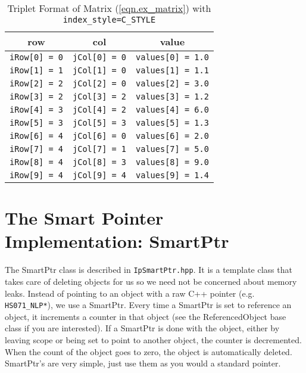 \documentclass[letter,10pt]{article}
\begin{document}
\begin{footnotesize}
\begin{table}[h]
\end{table}
\begin{table}[h]%
\begin{center}
\caption{Triplet Format of Matrix (\ref{eqn.ex_matrix}) 
with {\tt index\_style=C\_STYLE}}
\label{tab.sym_c_triplet}
\begin{tabular}{c c c}
row     		&       col     	&       value 			    \\
\hline
{\tt iRow[0] = 0}       &       {\tt jCol[0] = 0}       & {\tt values[0] = 1.0}     \\
{\tt iRow[1] = 1}       &       {\tt jCol[1] = 0}       & {\tt values[1] = 1.1}     \\
{\tt iRow[2] = 2}       &       {\tt jCol[2] = 0}       & {\tt values[2] = 3.0}     \\
{\tt iRow[3] = 2}       &       {\tt jCol[3] = 2}       & {\tt values[3] = 1.2}     \\
{\tt iRow[4] = 3}       &       {\tt jCol[4] = 2}       & {\tt values[4] = 6.0}     \\
{\tt iRow[5] = 3}       &       {\tt jCol[5] = 3}       & {\tt values[5] = 1.3}     \\
{\tt iRow[6] = 4}       &       {\tt jCol[6] = 0}       & {\tt values[6] = 2.0}     \\
{\tt iRow[7] = 4}       &       {\tt jCol[7] = 1}       & {\tt values[7] = 5.0}     \\
{\tt iRow[8] = 4}       &       {\tt jCol[8] = 3}       & {\tt values[8] = 9.0}     \\
{\tt iRow[9] = 4}       &       {\tt jCol[9] = 4}       & {\tt values[9] = 1.4}
\end{tabular}
\end{center}
\end{table}
\end{footnotesize}
\newpage
\section{The Smart Pointer Implementation: SmartPtr} \label{app.smart_ptr}

The SmartPtr class is described in {\tt IpSmartPtr.hpp}. It is a
template class that takes care of deleting objects for us so we need
not be concerned about memory leaks. Instead of pointing to an object
with a raw C++ pointer (e.g. {\tt HS071\_NLP*}), we use a SmartPtr.
Every time a SmartPtr is set to reference an object, it increments a
counter in that object (see the ReferencedObject base class if you are
interested). If a SmartPtr is done with the object, either by leaving
scope or being set to point to another object, the counter is
decremented. When the count of the object goes to zero, the object is
automatically deleted. SmartPtr's are very simple, just use them as
you would a standard pointer.
\end{document}

